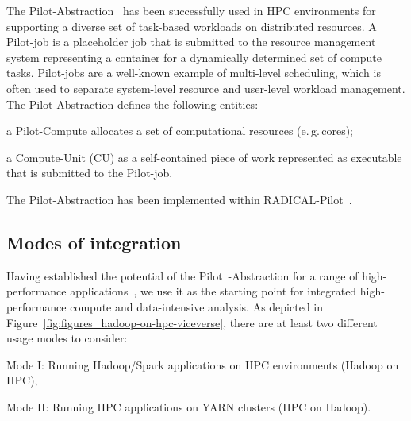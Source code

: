 The Pilot-Abstraction~\cite{luckow2012pstar} has been successfully used in HPC environments for supporting a diverse set of task-based workloads on distributed resources.
A Pilot-job is a placeholder job that is submitted to the resource management system representing a container for a dynamically determined set of compute tasks.
Pilot-jobs are a well-known example of multi-level scheduling, which is often used to separate system-level resource and user-level workload management.
The Pilot-Abstraction defines the following entities:
\begin{inparaenum} [(i)]
    \item a Pilot-Compute allocates a set of computational resources (e.\,g.\,cores);
    \item  a Compute-Unit (CU) as a self-contained piece of work represented as executable that is submitted to the Pilot-job.
\end{inparaenum}
The Pilot-Abstraction has been implemented within RADICAL-Pilot~\cite{merzky2018design}.


\subsection{Modes of integration}
\label{ssec:integration_mode}
Having established the potential of the Pilot~-Abstraction for a range of high-performance applications~\cite{treikalis2016repex,ragothaman2014developing,ko2014numerical}, we use it as the starting point for integrated high-performance compute and data-intensive analysis.
As depicted in Figure~\ref{fig:figures_hadoop-on-hpc-viceverse}, there are at least two different usage modes to consider:
\begin{compactenum}[(i)]
    \item Mode I: Running Hadoop/Spark applications on HPC environments (Hadoop on HPC),
    \item Mode II: Running HPC applications on YARN clusters (HPC on Hadoop).
\end{compactenum}

